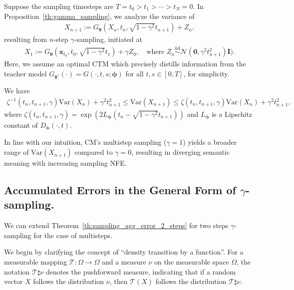 \documentclass{article} \usepackage{iclr2024_coNFErence,times}
\newcommand{\iid}{\overset{\mathrm{iid}}{\sim}}
\theoremstyle{definition}
\theoremstyle{remark}
\begin{document}
Suppose the sampling timesteps are $T=t_0>t_{1}>\cdots>t_N=0$. In Proposition~\ref{th:gamma_sampling}, we analyze the variance of 
\begin{align*}
    X_{n+1}:= G_{\bm{\theta}}(X_{n}, t_n, \sqrt{1-\gamma^2} t_{n+1}) + Z_n,
\end{align*}
 resulting from $n$-step $\gamma$-sampling, initiated at 
\begin{align*}
     X_1 := G_{\bm{\theta}}(\mathbf{x}_{t_0}, t_0, \sqrt{1-\gamma^2} t_1) + \gamma Z_0, \quad \text{where } Z_n \iid \mathcal{N}(\mathbf{0},\gamma^2t_{n+1}^2)\mathbf{I}).
 \end{align*}
Here, we assume an optimal CTM which precisely distills information from the teacher model $G_{\bm{\theta}^*}(\cdot)=G(\cdot, t, s; \bm{\phi})$ for all $t, s\in[0,T]$, for simplicity.
\begin{proposition}\label{th:gamma_sampling}
We have
    \begin{align*}
        \zeta^{-1}(t_n, t_{n+1}, \gamma)\text{Var}\left(X_n\right)  + \gamma^2t_{n+1}^2 \leq \text{Var}\left(X_{n+1}\right)\leq \zeta(t_n, t_{n+1}, \gamma) \text{Var}\left(X_{n}\right) + \gamma^2t_{n+1}^2,
    \end{align*}
    where $\zeta(t_n, t_{n+1}, \gamma)=\exp{\left(2L_{\bm{\phi}}(t_n-\sqrt{1-\gamma^2}t_{n+1})\right)}$ and $L_{\bm{\phi}}$ is a Lipschitz constant of $D_{\bm{\phi}}(\cdot, t)$.
\end{proposition}

In line with our intuition, CM's multistep sampling ($\gamma=1$) yields a broader range of $\text{Var}\left(X_{n+1}\right)$ compared to $\gamma=0$, resulting in diverging semantic meaning with increasing sampling NFE. 


\subsection{Accumulated Errors in the General Form of $\gamma$-sampling.}\label{sec:acc_error}

We can extend Theorem~\ref{th:sampling_agg_error_2_steps} for two steps $\gamma$-sampling for the case of multisteps. 


We begin by clarifying the concept of ``density transition by a function''. For a measurable mapping $\mathcal{T}: \Omega \rightarrow \Omega$ and a measure $\nu$ on the measurable space $\Omega$, the notation $\mathcal{T}\sharp \nu$ denotes the pushforward measure, indicating that if a random vector $X$ follows the distribution $\nu$, then $\mathcal{T}(X)$ follows the distribution $\mathcal{T}\sharp \nu$.
\end{document}
